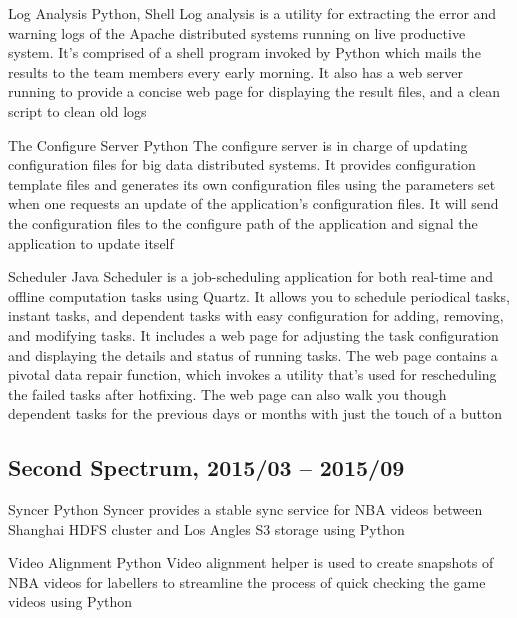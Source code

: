 \documentclass[11pt,a4paper]{moderncv}
\begin{document}
\vspace*{0.2\baselineskip}
\cventry{}
{Log Analysis}
{Python, Shell}
{}{}
{
Log analysis is a utility for extracting the error and warning logs of the Apache distributed systems running on live productive system. It's comprised of a shell program invoked by Python which mails the results to the team members every early morning. It also has a web server running to provide a concise web page for displaying the result files, and a clean script to clean old logs
}

\vspace*{0.2\baselineskip}
\cventry{}
{The Configure Server}
{Python}
{}{}
{
The configure server is in charge of updating configuration files for big data distributed systems. It provides configuration template files and generates its own configuration files using the parameters set when one requests an update of the application's configuration files. It will send the configuration files to the configure path of the application and signal the application to update itself
}

\vspace*{0.2\baselineskip}
\cventry{}
{Scheduler}
{Java}
{}{}
{
Scheduler is a job-scheduling application for both real-time and offline computation tasks using Quartz. It allows you to schedule periodical tasks, instant tasks, and dependent tasks with easy configuration for adding, removing, and modifying tasks. It includes a web page for adjusting the task configuration and displaying the details and status of running tasks. The web page contains a pivotal data repair function, which invokes a utility that's used for rescheduling the failed tasks after hotfixing. The web page can also walk you though dependent tasks for the previous days or months with just the touch of a button
}

\vspace*{0.2\baselineskip}
\subsection{Second Spectrum, 2015/03 -- 2015/09}
\cventry{}
{Syncer}
{Python}
{}{}
{
Syncer provides a stable sync service for NBA videos between Shanghai HDFS cluster and Los Angles S3 storage using Python
}

\vspace*{0.2\baselineskip}
\cventry{}
{Video Alignment}
{Python}
{}{}
{
Video alignment helper is used to create snapshots of NBA videos for labellers to streamline the process of quick checking the game videos using Python
}
\end{document}
